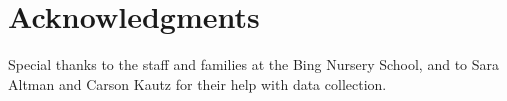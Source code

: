 \documentclass[10pt,letterpaper]{article}
\begin{document}
\section{Acknowledgments}

Special thanks to the staff and families at the Bing Nursery School, and to Sara Altman and Carson Kautz for their help with data collection. 



\setlength{\bibleftmargin}{.125in} \setlength{\bibindent}{-\bibleftmargin}


\end{document}
